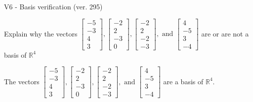 \begin{exercise}
  \begin{exerciseTitle}V6 - Basis verification (ver. 295)\end{exerciseTitle}
  \begin{exerciseStatement}
    Explain why the vectors \(\left[\begin{array}{r}
-5 \\
-3 \\
4 \\
3
\end{array}\right] , \left[\begin{array}{r}
-2 \\
2 \\
-3 \\
0
\end{array}\right] , \left[\begin{array}{r}
-2 \\
2 \\
-2 \\
-3
\end{array}\right] , \text{ and } \left[\begin{array}{r}
4 \\
-5 \\
3 \\
-4
\end{array}\right]\) are or are not a basis of \(\mathbb{R}^4\)	


  \end{exerciseStatement}
  \begin{exerciseAnswer}
   The vectors \(\left[\begin{array}{r}
-5 \\
-3 \\
4 \\
3
\end{array}\right] , \left[\begin{array}{r}
-2 \\
2 \\
-3 \\
0
\end{array}\right] , \left[\begin{array}{r}
-2 \\
2 \\
-2 \\
-3
\end{array}\right] , \text{ and } \left[\begin{array}{r}
4 \\
-5 \\
3 \\
-4
\end{array}\right]\) 
  	 are  a basis of \(\mathbb{R}^4\).
  


  \end{exerciseAnswer}
\end{exercise}